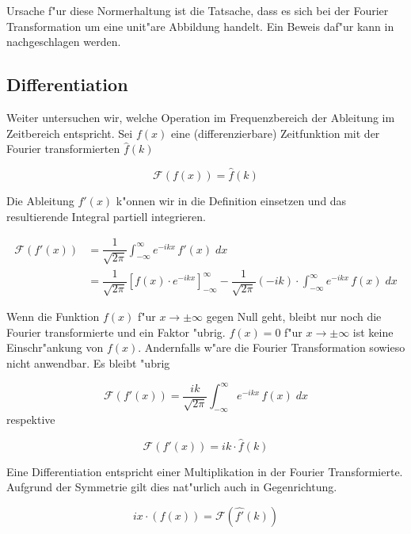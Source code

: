 \begin{refsection}
Ursache f"ur diese Normerhaltung ist die Tatsache, dass es sich bei der Fourier Transformation um eine unit"are Abbildung handelt. Ein Beweis daf"ur kann in \cite{online:impulsdarstellung} nachgeschlagen werden.

\subsection{Differentiation}
\label{chapter:ftrans_differentation}

Weiter untersuchen wir, welche Operation im Frequenzbereich der Ableitung im Zeitbereich entspricht. Sei $f(x)$ eine (differenzierbare) Zeitfunktion mit der Fourier transformierten $\hat{f}(k)$

\begin{equation}
\mathcal{F}(f(x)) = \hat{f}(k)
\end{equation}

Die Ableitung $f'(x)$ k"onnen wir in die Definition einsetzen und das resultierende Integral partiell integrieren. 

\begin{align}
\mathcal{F}(f'(x)) &= \dfrac{1}{\sqrt{2\pi}}\int_{-\infty}^{\infty}e^{-i k x} \, f'(x) \; dx\\
&= \dfrac{1}{\sqrt{2\pi}}\left[f(x)\cdot e^{-i k x} \right]_{-\infty}^{\infty}-  \dfrac{1}{\sqrt{2\pi}}(-ik)\cdot\int_{-\infty}^{\infty}e^{-i k x} \, f(x) \; dx
\end{align}

Wenn die Funktion $f(x)$ f"ur $x \rightarrow \pm \infty$ gegen Null geht, bleibt nur noch die Fourier transformierte und ein Faktor "ubrig. $f(x) = 0$ f"ur  $x \rightarrow \pm \infty$ ist keine Einschr"ankung von $f(x)$. Andernfalls w"are die Fourier Transformation sowieso nicht anwendbar. Es bleibt "ubrig

\begin{equation}
\mathcal{F}(f'(x))= \dfrac{ik}{\sqrt{2\pi}}\int_{-\infty}^{\infty}e^{-i k x} \, f(x) \; dx
\end{equation}
respektive

\begin{equation}
\mathcal{F}(f'(x))= ik\cdot\hat{f}(k)
\end{equation}

Eine Differentiation entspricht einer Multiplikation in der Fourier Transformierte. Aufgrund der Symmetrie gilt dies nat"urlich auch in Gegenrichtung.

\begin{equation}
ix\cdot(f(x))= \mathcal{F}(\hat{f'}(k))
\end{equation}


\end{refsection}

